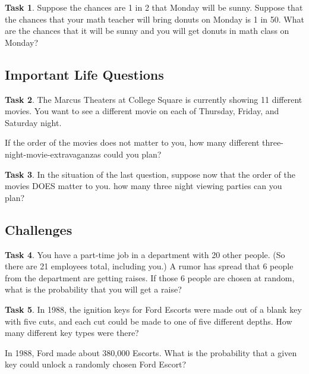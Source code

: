 \documentclass[12pt,letterpaper]{article}
\theoremstyle{definition}
\newtheorem{task}{Task}
\begin{document}
\begin{task}
Suppose the chances are 1 in 2 that Monday will be sunny. Suppose that the chances that your math teacher will bring donuts on Monday is 1 in 50. What are the chances that it will be sunny and you will get donuts in math class on Monday?
\end{task}

\subsection*{Important Life Questions}

\begin{task}
The Marcus Theaters at College Square is currently showing 11 different movies. You want to see a different movie on each of Thursday, Friday, and Saturday night.

If the order of the movies does not matter to you, how many different three-night-movie-extravaganzas could you plan?
\end{task}

\begin{task}
In the situation of the last question, suppose now that the order of the movies DOES matter to you. how many three night viewing parties can you plan?
\end{task}

\subsection*{Challenges}

\begin{task}
You have a part-time job in a department with 20 other people. (So there are 21 employees total, including you.) A rumor has spread that 6 people from the department are getting raises. If those 
6 people are chosen at random, what is the probability that you will get a raise?
\end{task}

\begin{task}
In 1988, the ignition keys for Ford Escorts were made out of a blank key with five cuts, and each cut could be made to one of five different depths. How many different key types were there?

In 1988, Ford made about 380,000 Escorts. What is the probability that a given key could unlock a 
randomly chosen Ford Escort?
\end{task}
\end{document}
